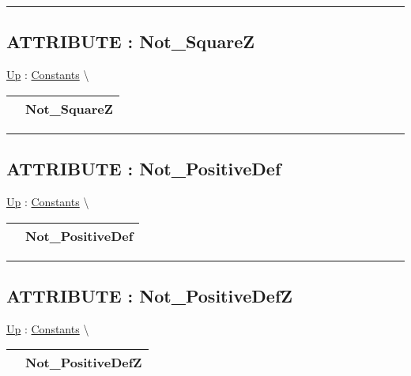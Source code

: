\par


\rule{\linewidth}{0.5pt}
\subsection*{ATTRIBUTE : Not\_SquareZ}
\hypertarget{ecldoc:pbblas.constants.not_squarez}{}
\hyperlink{ecldoc:PBblas.Constants}{Up} :
\hspace{0pt} \hyperlink{ecldoc:PBblas.Constants}{Constants} \textbackslash 

{\renewcommand{\arraystretch}{1.5}
\begin{tabularx}{\textwidth}{|>{\raggedright\arraybackslash}l|X|}
\hline
\hspace{0pt} & Not\_SquareZ \\
\hline
\end{tabularx}
}

\par


\rule{\linewidth}{0.5pt}
\subsection*{ATTRIBUTE : Not\_PositiveDef}
\hypertarget{ecldoc:pbblas.constants.not_positivedef}{}
\hyperlink{ecldoc:PBblas.Constants}{Up} :
\hspace{0pt} \hyperlink{ecldoc:PBblas.Constants}{Constants} \textbackslash 

{\renewcommand{\arraystretch}{1.5}
\begin{tabularx}{\textwidth}{|>{\raggedright\arraybackslash}l|X|}
\hline
\hspace{0pt} & Not\_PositiveDef \\
\hline
\end{tabularx}
}

\par


\rule{\linewidth}{0.5pt}
\subsection*{ATTRIBUTE : Not\_PositiveDefZ}
\hypertarget{ecldoc:pbblas.constants.not_positivedefz}{}
\hyperlink{ecldoc:PBblas.Constants}{Up} :
\hspace{0pt} \hyperlink{ecldoc:PBblas.Constants}{Constants} \textbackslash 

{\renewcommand{\arraystretch}{1.5}
\begin{tabularx}{\textwidth}{|>{\raggedright\arraybackslash}l|X|}
\hline
\hspace{0pt} & Not\_PositiveDefZ \\
\hline
\end{tabularx}
}

